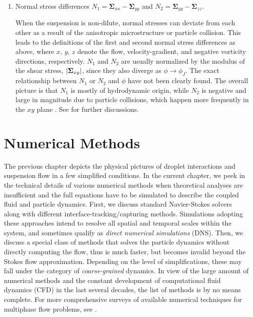 \begin{enumerate}
\item Normal stress differences $N_1=\bm{\Sigma}_{xx}-\bm{\Sigma}_{yy}$ and $N_2=\bm{\Sigma}_{yy}-\bm{\Sigma}_{zz}$.

\medskip
When the suspension is non-dilute, normal stresses can deviate from each other as a result of the anisotropic microstructure or particle collision.
This leads to the definitions of the first and second normal stress differences as above, where $x$, $y$, $z$ denote the flow, velocity-gradient, and negative vorticity directions, respectively.
$N_1$ and $N_2$ are usually normalized by the modulus of the shear stress, $\lvert\bm{\Sigma}_{xy}\rvert$, since they also diverge as $\phi \to \phi_J$.
The exact relationship between $N_1$ or $N_2$ and $\phi$ have not been clearly found. The overall picture is that $N_1$ is mostly of hydrodynamic origin, while $N_2$ is negative and large in magnitude due to particle collisions, which happen more frequently in the $xy$ plane \citep{guazzelli_pouliquen_2018}.
See \cite{seto_giusteri_2018} for further discussions.

\end{enumerate}



\chapter{Numerical Methods}  \label{chp:num-methods}


The previous chapter depicts the physical pictures of droplet interactions and suspension flow in a few simplified conditions.
In the current chapter, we peek in the technical details of various numerical methods when theoretical analyses are insufficient and the full equations have to be simulated to describe the coupled fluid and particle dynamics.
First, we discuss standard Navier-Stokes solvers along with different interface-tracking/capturing methods. Simulations adopting these approaches intend to resolve all spatial and temporal scales within the system, and sometimes qualify as \emph{direct numerical simulations} (DNS).
Then, we discuss a special class of methods that solves the particle dynamics without directly computing the flow, thus is much faster, but becomes invalid beyond the Stokes flow approximation. Depending on the level of simplifications, these may fall under the category of \emph{coarse-grained} dynamics.
In view of the large amount of numerical methods and the constant development of computational fluid dynamics (CFD) in the last several decades, the list of methods is by no means complete. For more comprehensive surveys of available numerical techniques for multiphase flow problems, see \cite{prosperetti_tryggvason_2007, Rosti2019}.


